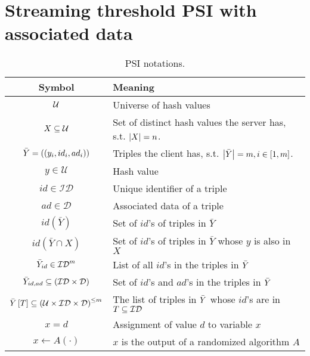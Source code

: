
\section{Streaming threshold PSI with associated data} %
\label{sec:streaming_threshold_psi_with_associated_data}



\begin{table}[H]
\centering
	\begin{tabular}{c l}
\toprule
	

		\textbf{Symbol} & \textbf{Meaning} \\
		\hline
		\hline
		$\mathcal{U}$	& 	Universe of hash values\\
		$X \subseteq \mathcal{U}$	&Set of distinct hash values the server has, s.t. $\left\lvert X\right\rvert = n$. \\
		$\bar{Y} = \left(\left(y_i, id_i, ad_i \right)\right)$	& Triples the client has, s.t. $\left\lvert\bar{Y}\right\rvert = m, i \in \left[1,m\right]$.	\\
		$y \in \mathcal{U}$	& 	Hash value\\
		$id \in \mathcal{ID}$	& 	Unique identifier of a triple\\
		$ad \in \mathcal{D}$	& 	Associated data of a triple\\
		$id(\bar{Y})$& Set of $id$'s of triples in $\bar{Y}$     \\

		$id(\bar{Y} \cap X)$& Set of $id$'s of triples in $\bar{Y}$ whose $y$ is also in $X$     \\
		$\bar{Y}_{id} \in \mathcal{ID}^{m}$	& List of all $id$'s in the triples in $\bar{Y}$    \\
		$\bar{Y}_{id, ad} \subseteq \left(\mathcal{ID} \times \mathcal{D}\right) $ & Set of $id$'s and $ad$'s in the triples in $\bar{Y}$  \\
		{$\bar{Y} \left[T\right]\subseteq \left(\mathcal{U} \times \mathcal{ID} \times \mathcal{D}\right)^{\leq m} $ }	& The list of triples in $\bar{Y}$ whose $id$'s are in $T \subseteq \mathcal{ID}$  \\

		$x = d$	&   Assignment of value $d$ to variable $x$  \\
		$x \gets A (\cdot)$	&   $x$ is the output of a randomized algorithm $A$\\

\bottomrule
	\end{tabular}
	\caption{PSI notations.}
	\label{tbl:noataions}
\end{table}
